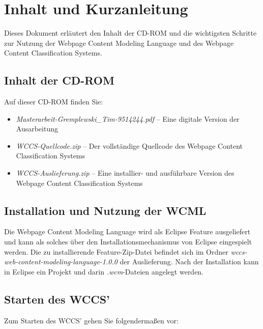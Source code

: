 \documentclass[parskip=half]{scrartcl}
\begin{document}
    \section*{Inhalt und Kurzanleitung}
    Dieses Dokument erläutert den Inhalt der CD-ROM und
    die wichtigsten Schritte zur Nutzung der
    Webpage Content Modeling Language und des
    Webpage Content Classification Systems.

    \subsection*{Inhalt der CD-ROM}
        Auf dieser CD-ROM finden Sie:

        \begin{itemize}
            \item \textit{Masterarbeit-Gremplewski\_Tim-9514244.pdf} -- Eine digitale Version der Ausarbeitung
            \item \textit{WCCS-Quellcode.zip} -- Der vollständige Quellcode des Webpage Content Classification Systems
            \item \textit{WCCS-Auslieferung.zip} -- Eine installier- und ausführbare Version des Webpage Content Classification Systems
        \end{itemize}

    \subsection*{Installation und Nutzung der WCML}
        Die Webpage Content Modeling Language wird als Eclipse Feature ausgeliefert
        und kann als solches über den Installationsmechanismus von Eclipse eingespielt werden.
        Die zu installierende Feature-Zip-Datei befindet sich im
        Ordner \textit{wccs-web-content-modeling-language-1.0.0}
        der Auslieferung.
        Nach der Installation kann in Eclipse ein Projekt und darin \textit{.wcm}-Dateien angelegt werden.

    \subsection*{Starten des WCCS'}
        Zum Starten des WCCS' gehen Sie folgendermaßen vor:
\end{document}
